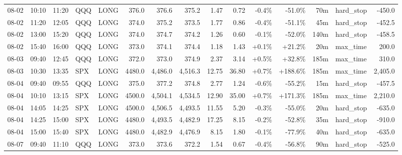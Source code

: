 \documentclass[11pt,a4paper,twoside]{article}
\begin{document}
\begin{landscape}
\begin{center}
\begin{longtable}{>{\color{txtmain}}l l l l l r r r r r r r r >{\color{txtmain}}l r}
08-02 & 10:10 & 11:20 & QQQ & LONG & 376.0 & 376.6 & 375.2 & 1.47 & 0.72 & \textcolor{lossred}{-0.4\%} & \textcolor{lossred}{-51.0\%} & 70m & hard\_stop & \textcolor{lossred}{-450.0} \\
08-02 & 11:20 & 12:05 & QQQ & LONG & 374.0 & 375.2 & 373.5 & 1.77 & 0.86 & \textcolor{lossred}{-0.4\%} & \textcolor{lossred}{-51.1\%} & 45m & hard\_stop & \textcolor{lossred}{-452.5} \\
08-02 & 13:00 & 15:20 & QQQ & LONG & 374.0 & 374.7 & 374.2 & 1.26 & 0.60 & \textcolor{lossred}{-0.1\%} & \textcolor{lossred}{-52.0\%} & 140m & hard\_stop & \textcolor{lossred}{-458.5} \\
08-02 & 15:40 & 16:00 & QQQ & LONG & 373.0 & 374.1 & 374.4 & 1.18 & 1.43 & \textcolor{wingreen}{+0.1\%} & \textcolor{wingreen}{+21.2\%} & 20m & max\_time & \textcolor{wingreen}{200.0} \\
08-03 & 09:40 & 12:45 & QQQ & LONG & 372.0 & 373.0 & 374.9 & 2.37 & 3.14 & \textcolor{wingreen}{+0.5\%} & \textcolor{wingreen}{+32.8\%} & 185m & max\_time & \textcolor{wingreen}{310.0} \\
08-03 & 10:30 & 13:35 & SPX & LONG & 4480.0 & 4,486.0 & 4,516.3 & 12.75 & 36.80 & \textcolor{wingreen}{+0.7\%} & \textcolor{wingreen}{+188.6\%} & 185m & max\_time & \textcolor{wingreen}{2,405.0} \\
08-04 & 09:40 & 09:55 & QQQ & LONG & 375.0 & 377.2 & 374.8 & 2.77 & 1.24 & \textcolor{lossred}{-0.6\%} & \textcolor{lossred}{-55.2\%} & 15m & hard\_stop & \textcolor{lossred}{-457.5} \\
08-04 & 10:10 & 13:15 & SPX & LONG & 4500.0 & 4,504.1 & 4,534.5 & 12.90 & 35.00 & \textcolor{wingreen}{+0.7\%} & \textcolor{wingreen}{+171.3\%} & 185m & max\_time & \textcolor{wingreen}{2,210.0} \\
08-04 & 14:05 & 14:25 & SPX & LONG & 4500.0 & 4,506.5 & 4,493.5 & 11.55 & 5.20 & \textcolor{lossred}{-0.3\%} & \textcolor{lossred}{-55.0\%} & 20m & hard\_stop & \textcolor{lossred}{-635.0} \\
08-04 & 14:25 & 15:00 & SPX & LONG & 4480.0 & 4,493.5 & 4,482.9 & 17.25 & 8.15 & \textcolor{lossred}{-0.2\%} & \textcolor{lossred}{-52.8\%} & 35m & hard\_stop & \textcolor{lossred}{-910.0} \\
08-04 & 15:00 & 15:40 & SPX & LONG & 4480.0 & 4,482.9 & 4,476.9 & 8.15 & 1.80 & \textcolor{lossred}{-0.1\%} & \textcolor{lossred}{-77.9\%} & 40m & hard\_stop & \textcolor{lossred}{-635.0} \\
08-07 & 09:40 & 11:10 & QQQ & LONG & 373.0 & 373.6 & 372.2 & 1.54 & 0.67 & \textcolor{lossred}{-0.4\%} & \textcolor{lossred}{-56.8\%} & 90m & hard\_stop & \textcolor{lossred}{-525.0} \\

\end{longtable}
\end{center}
\end{landscape}
\end{document}
